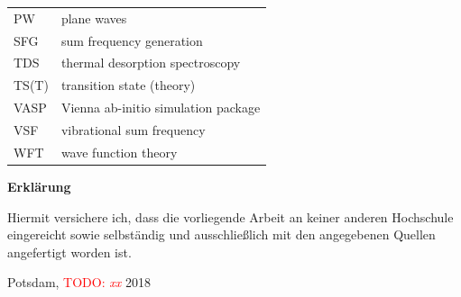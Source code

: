 \documentclass[11pt,DIV=13,BCOR=5mm,a4paper,headinclude]{scrbook}
\newcommand\todo[1]{\textcolor{red}{TODO: \textit{{#1}}}}
\begin{document}
\begin{table}[!h]
\begin{tabular}{ll}
PW & plane waves\\
SFG & sum frequency generation\\
TDS &thermal desorption spectroscopy\\
TS(T) & transition state (theory)\\
VASP & Vienna ab-initio simulation package\\
VSF & vibrational sum frequency\\
WFT & wave function theory\\

  \end{tabular}
\end{table}
\clearpage

\begingroup
\let\clearpage\relax
\renewcommand*{\chapterheadstartvskip}{\vspace*{-2\baselineskip}}
\begin{small}
 
 
\end{small}
\endgroup



\clearpage
\pagestyle{empty}
\begin{center}
  {\Large\sffamily\bfseries Erklärung}
\end{center}

\vspace{\baselineskip}

Hiermit versichere ich, dass die vorliegende Arbeit an keiner anderen Hochschule eingereicht sowie selbständig und ausschließlich mit den angegebenen Quellen angefertigt worden ist.\\

\begin{flushleft}
  Potsdam, \todo{xx} 2018
\end{flushleft}
\end{document}

